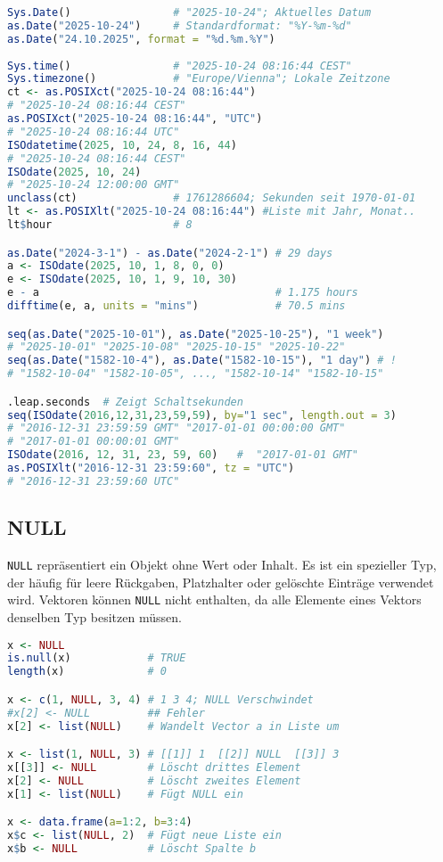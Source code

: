 \documentclass[10pt,twocolumn]{scrartcl}
\begin{document}
\begin{lstlisting}[language=R]
Sys.Date()                # "2025-10-24"; Aktuelles Datum
as.Date("2025-10-24")     # Standardformat: "%Y-%m-%d"
as.Date("24.10.2025", format = "%d.%m.%Y")
  
Sys.time()                # "2025-10-24 08:16:44 CEST"
Sys.timezone()            # "Europe/Vienna"; Lokale Zeitzone
ct <- as.POSIXct("2025-10-24 08:16:44")
# "2025-10-24 08:16:44 CEST"
as.POSIXct("2025-10-24 08:16:44", "UTC")
# "2025-10-24 08:16:44 UTC"
ISOdatetime(2025, 10, 24, 8, 16, 44)
# "2025-10-24 08:16:44 CEST"
ISOdate(2025, 10, 24)
# "2025-10-24 12:00:00 GMT"
unclass(ct)               # 1761286604; Sekunden seit 1970-01-01
lt <- as.POSIXlt("2025-10-24 08:16:44") #Liste mit Jahr, Monat..
lt$hour                   # 8

as.Date("2024-3-1") - as.Date("2024-2-1") # 29 days
a <- ISOdate(2025, 10, 1, 8, 0, 0)
e <- ISOdate(2025, 10, 1, 9, 10, 30)
e - a                                     # 1.175 hours
difftime(e, a, units = "mins")            # 70.5 mins

seq(as.Date("2025-10-01"), as.Date("2025-10-25"), "1 week")
# "2025-10-01" "2025-10-08" "2025-10-15" "2025-10-22"
seq(as.Date("1582-10-4"), as.Date("1582-10-15"), "1 day") # !
# "1582-10-04" "1582-10-05", ..., "1582-10-14" "1582-10-15"

.leap.seconds  # Zeigt Schaltsekunden
seq(ISOdate(2016,12,31,23,59,59), by="1 sec", length.out = 3)
# "2016-12-31 23:59:59 GMT" "2017-01-01 00:00:00 GMT"
# "2017-01-01 00:00:01 GMT"
ISOdate(2016, 12, 31, 23, 59, 60)   #  "2017-01-01 GMT"
as.POSIXlt("2016-12-31 23:59:60", tz = "UTC")
# "2016-12-31 23:59:60 UTC"
\end{lstlisting}

\subsection{NULL}

\lstinline|NULL| repräsentiert ein Objekt ohne Wert oder Inhalt. 
Es ist ein spezieller Typ, der häufig für leere Rückgaben, Platzhalter oder gelöschte Einträge verwendet wird.
Vektoren können \lstinline|NULL| nicht enthalten, da alle Elemente eines Vektors denselben Typ besitzen müssen.

\begin{lstlisting}[language=R]
x <- NULL
is.null(x)            # TRUE
length(x)             # 0

x <- c(1, NULL, 3, 4) # 1 3 4; NULL Verschwindet
#x[2] <- NULL         ## Fehler
x[2] <- list(NULL)    # Wandelt Vector a in Liste um

x <- list(1, NULL, 3) # [[1]] 1  [[2]] NULL  [[3]] 3
x[[3]] <- NULL        # Löscht drittes Element
x[2] <- NULL          # Löscht zweites Element
x[1] <- list(NULL)    # Fügt NULL ein

x <- data.frame(a=1:2, b=3:4)
x$c <- list(NULL, 2)  # Fügt neue Liste ein
x$b <- NULL           # Löscht Spalte b
\end{lstlisting}
\end{document}
